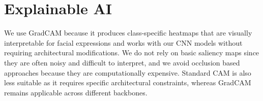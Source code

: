 \section{Explainable AI}
\label{sec:explainable_ai}

We use GradCAM \cite{DBLP:journals/corr/SelvarajuDVCPB16} because it produces class-specific heatmaps that are visually interpretable for facial expressions and works with our CNN models without requiring architectural modifications. We do not rely on basic saliency maps since they are often noisy and difficult to interpret, and we avoid occlusion based approaches because they are computationally expensive. Standard CAM is also less suitable as it requires specific architectural constraints, whereas GradCAM remains applicable across different backbones.
